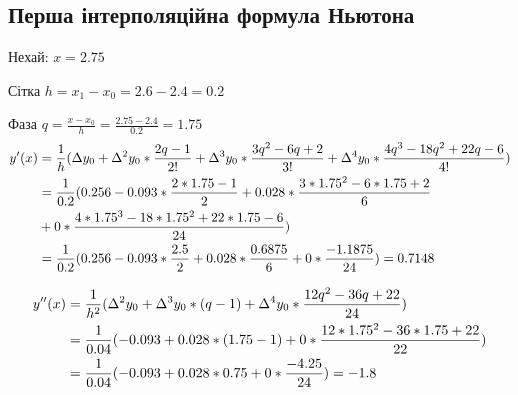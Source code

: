 \subsection{Перша інтерполяційна формула Ньютона}
\label{subsec:forward_newton}

Нехай:
$x = 2.75$

Сітка $h = x_1 - x_0 = 2.6 - 2.4 = 0.2$

Фаза $q = \frac{x - x_0}{h} = \frac{2.75 - 2.4}{0.2} = 1.75$
\begin{align}
    y'(x) & = \frac{1}{h}
    ( \Delta                     y_0
    + \Delta \textsuperscript{2} y_0 * \frac{2q - 1}{2!}
    + \Delta \textsuperscript{3} y_0 * \frac{3q^2 - 6q + 2}{3!}
    + \Delta \textsuperscript{4} y_0 * \frac{4q^3 - 18q^2 + 22q - 6}{4!} )  \\
          & = \frac{1}{0.2}
    ( 0.256
    - 0.093 * \frac{2 * 1.75 - 1}{2}
    + 0.028 * \frac{3 * 1.75^2 - 6 * 1.75 + 2}{6}                           \\
          & + 0     * \frac{4 * 1.75^3 - 18 * 1.75^2 + 22 * 1.75 - 6}{24} ) \\
          & = \frac{1}{0.2}
    ( 0.256
    - 0.093 * \frac{2.5}{2}
    + 0.028 * \frac{0.6875}{6}
    + 0     * \frac{-1.1875}{24} )
    = 0.7148
\end{align}

\begin{align}
    y''(x) & = \frac{1}{h^2}
    ( \Delta \textsuperscript{2} y_0
    + \Delta \textsuperscript{3} y_0 * (q - 1)
    + \Delta \textsuperscript{4} y_0 * \frac{12q^2 - 36q + 22}{24} ) \\
           & = \frac{1}{0.04} (
    - 0.093
    + 0.028 * (1.75 - 1)
    + 0     * \frac{12 * 1.75^2 - 36 * 1.75 + 22}{22} )              \\
           & = \frac{1}{0.04} (
    - 0.093
    + 0.028 * 0.75
    + 0     * \frac{-4.25}{24} )
    = -1.8
\end{align}
